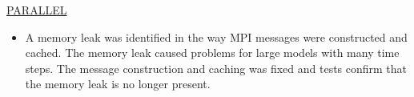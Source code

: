 

	\underline{PARALLEL}
	\begin{itemize}
		\item A memory leak was identified in the way MPI messages were constructed and cached.  The memory leak caused problems for large models with many time steps.  The message construction and caching was fixed and tests confirm that the memory leak is no longer present.
	\end{itemize}

